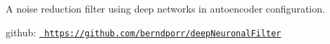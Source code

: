 A noise reduction filter using deep networks in autoencoder configuration.

github\+: \href{https://github.com/berndporr/deepNeuronalFilter}{\texttt{ https\+://github.\+com/berndporr/deep\+Neuronal\+Filter}} 
